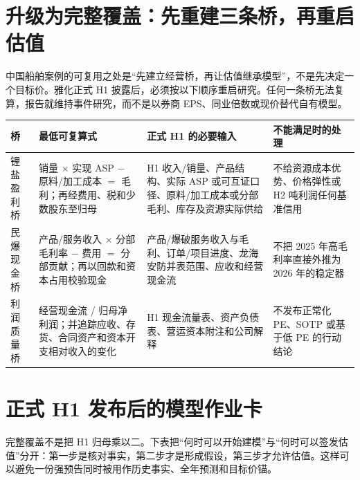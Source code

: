 \section{升级为完整覆盖：先重建三条桥，再重启估值}

中国船舶案例的可复用之处是“先建立经营桥，再让估值继承模型”，不是先决定一个目标价。雅化正式 H1 披露后，必须按以下顺序重启研究。任何一条桥无法复算，报告就维持事件研究，而不是以券商 EPS、同业倍数或现价替代自有模型。

\begin{exhibitbox}
\begin{tabularx}{\exhibitboxwidth}{L{2.2cm}X X X}
\toprule
桥 & 最低可复算式 & 正式 H1 的必要输入 & 不能满足时的处理 \\
\midrule
锂盐盈利桥 & 销量 $\times$ 实现 ASP $-$ 原料/加工成本 $=$ 毛利；再经费用、税和少数股东至归母 & H1 收入/销量、产品结构、实际 ASP 或可互证口径、原料/加工成本或分部毛利、库存及资源实际供给 & 不给资源成本优势、价格弹性或 H2 吨利润任何基准信用 \\
民爆现金桥 & 产品/服务收入 $\times$ 分部毛利率 $-$ 费用 $=$ 分部贡献；再以回款和资本占用校验现金 & 产品/爆破服务收入与毛利、订单/项目进度、龙海安防并表范围、应收和经营现金流 & 不把 2025 年高毛利率直接外推为 2026 年的稳定器 \\
利润质量桥 & 经营现金流 / 归母净利润；并追踪应收、存货、合同资产和资本开支相对收入的变化 & H1 现金流量表、资产负债表、营运资本附注和公司解释 & 不发布正常化 PE、SOTP 或基于低 PE 的行动结论 \\
\bottomrule
\end{tabularx}
\end{exhibitbox}

\section{正式 H1 发布后的模型作业卡}

完整覆盖不是把 H1 归母乘以二。下表把“何时可以开始建模”与“何时可以签发估值”分开：第一步是核对事实，第二步才是形成假设，第三步才允许估值。这样可以避免一份强预告同时被用作历史事实、全年预测和目标价锚。

